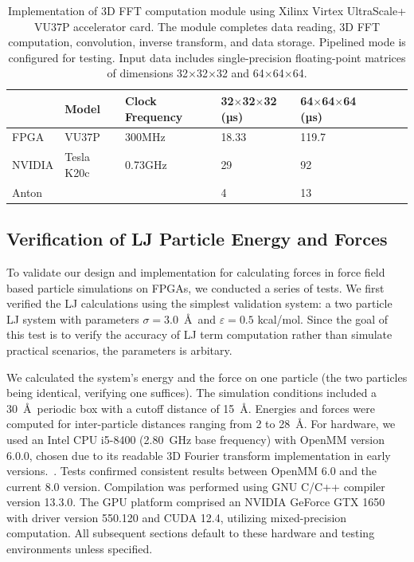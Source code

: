 \documentclass{article}
\begin{document}
\begin{table}[!ht]
	\centering
	\caption[Performance comparison of 3D FFT computation module at different clock frequencies]{Implementation of 3D FFT computation module using Xilinx Virtex UltraScale+ VU37P accelerator card. The module completes data reading, 3D FFT computation, convolution, inverse transform, and data storage. Pipelined mode is configured for testing. Input data includes single-precision floating-point matrices of dimensions 32$\times$32$\times$32 and 64$\times$64$\times$64.}
	\begin{tabular*}{\hsize}{@{}@{\extracolsep{\fill}}llllllll@{}}
		\toprule
		~ & Model & Clock Frequency & 32$\times$32$\times$32 (µs) & 64$\times$64$\times$64 (µs) \\
		\midrule
		FPGA & VU37P & 300MHz & 18.33 & 119.7 \\
		NVIDIA\cite{8056853} & Tesla K20c & 0.73GHz & 29 & 92 \\
		Anton\cite{anton1} & ~ & ~ & 4 & 13 \\
		\bottomrule
	\end{tabular*}
	
	\label{fftspeed}
\end{table}

\subsection{Verification of LJ Particle Energy and Forces}

To validate our design and implementation for calculating forces in force 
field based particle simulations on FPGAs, we conducted a series of tests. 
We first verified the LJ calculations using the simplest validation system: 
a two particle LJ system with parameters $\sigma = 3.0$~\AA\ and 
$\varepsilon = 0.5$ kcal/mol. 
Since the goal of this test is to verify the accuracy of LJ term computation 
rather than simulate practical scenarios, the parameters is arbitary.

We calculated the system's energy and the force on one particle 
(the two particles being identical, verifying one suffices). 
The simulation conditions included a 30~\AA\ periodic box with a cutoff 
distance of 15~\AA. Energies and forces were computed for inter-particle 
distances ranging from 2 to 28~\AA. 
For hardware, we used an Intel CPU i5-8400 (2.80~GHz base frequency) 
with OpenMM version 6.0.0, chosen due to its readable 3D Fourier transform 
implementation in early versions.~\cite{OpenMM7,OpenMM8}. 
Tests confirmed consistent results between OpenMM 6.0 and the current 8.0 
version. 
Compilation was performed using GNU C/C++ compiler version 13.3.0.
The GPU platform comprised an NVIDIA GeForce GTX 1650 with driver version 
550.120 and CUDA 12.4, utilizing mixed-precision computation. 
All subsequent sections default to these hardware and testing environments 
unless specified.
\end{document}
